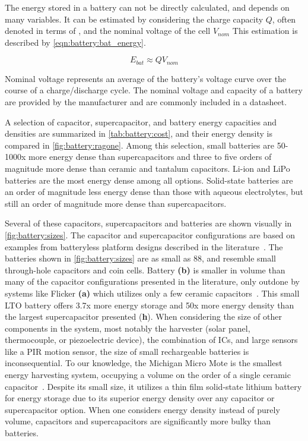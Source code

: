 The energy stored in a battery can not be directly calculated, and depends on many variables. It can be estimated by considering the charge capacity $Q$, often denoted in terms of \si{\Ah}, and the nominal voltage of the cell $V_{nom}$
This estimation is described by \cref{eqn:battery:bat_energy}.

\begin{equation} \label{eqn:battery:bat_energy}
E_{bat} \approx Q V_{nom}
\end{equation}

\noindent Nominal voltage represents an average of the battery's voltage curve over the course of a charge/discharge cycle. The nominal voltage and capacity of a battery are provided by the manufacturer and are commonly included in a datasheet.


A selection of capacitor, supercapacitor, and battery energy capacities and densities are summarized in \cref{tab:battery:cost}, and their energy density is compared in \cref{fig:battery:ragone}. Among this selection, small batteries are 50-1000x more energy dense than supercapacitors and three to five orders of magnitude more dense than ceramic and tantalum capacitors. Li-ion and LiPo batteries are the most energy dense among all options. Solid-state batteries are an order of magnitude less energy dense than those with aqueous electrolytes, but still an order of magnitude more dense than supercapacitors. 

Several of these capacitors, supercapacitors and batteries are shown visually in \cref{fig:battery:sizes}.
The capacitor and supercapacitor configurations are based on examples from batteryless platform designs described in the literature~\cite{hesterFlicker17, campbellEnergy14,colinReconfigurable18}.
The batteries shown in \cref{fig:battery:sizes} are
as small as 88\ssi{\milli\meter\cubed}, and resemble small through-hole
capacitors and coin cells. Battery \textbf{(b)} is smaller in volume than many of the capacitor
configurations presented in the literature, only outdone by systems like Flicker \textbf{(a)} which utilizes only a few ceramic capacitors~\cite{hesterFlicker17}.
This small LTO battery offers 3.7x 
more energy storage and 50x more energy density than the largest supercapacitor presented (\textbf{h}). When considering the size of other components in the system, most notably the harvester (solar panel, thermocouple, or piezoelectric device), the combination of ICs, and large sensors like a PIR motion sensor, the size of small rechargeable batteries is inconsequential. 
To our knowledge, the Michigan Micro Mote is the smallest energy harvesting system, occupying a volume on the order of a single ceramic capacitor~\cite{lee2013modular}. Despite its small size, it utilizes a thin film solid-state lithium battery for energy storage due to its superior energy density over any capacitor or supercapacitor option.
When one considers energy density instead of purely volume, capacitors and supercapacitors are significantly more bulky than batteries.

